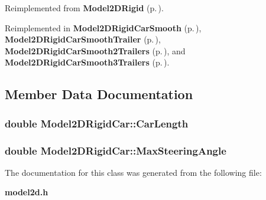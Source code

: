 Reimplemented from {\bf Model2DRigid} {\rm (p.\,\pageref{class_Model2DRigid_a3})}.

Reimplemented in {\bf Model2DRigid\-Car\-Smooth} {\rm (p.\,\pageref{class_Model2DRigidCarSmooth_a2})}, {\bf Model2DRigid\-Car\-Smooth\-Trailer} {\rm (p.\,\pageref{class_Model2DRigidCarSmoothTrailer_a2})}, {\bf Model2DRigid\-Car\-Smooth2Trailers} {\rm (p.\,\pageref{class_Model2DRigidCarSmooth2Trailers_a2})}, and {\bf Model2DRigid\-Car\-Smooth3Trailers} {\rm (p.\,\pageref{class_Model2DRigidCarSmooth3Trailers_a2})}.

\subsection{Member Data Documentation}
\subsubsection{\setlength{\rightskip}{0pt plus 5cm}double Model2DRigid\-Car::Car\-Length}\label{class_Model2DRigidCar_m1}


\subsubsection{\setlength{\rightskip}{0pt plus 5cm}double Model2DRigid\-Car::Max\-Steering\-Angle}\label{class_Model2DRigidCar_m0}




The documentation for this class was generated from the following file:\begin{CompactItemize}
\item 
{\bf model2d.h}\end{CompactItemize}
